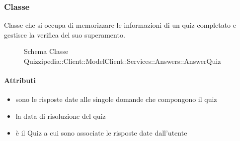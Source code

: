 \subsubsection{Classe }
Classe che si occupa di memorizzare le informazioni di un quiz completato e gestisce la verifica del suo superamento.
\begin{figure}[H]
\centering
\noindent{}
\caption[Schema Classe AnswerQuiz]{Schema Classe Quizzipedia::Client::ModelClient::Services::Answers::AnswerQuiz}
\end{figure}
\paragraph{Attributi}
\begin{itemize}
\item {}
\newline
sono le risposte date alle singole domande che compongono il quiz
\item {}
\newline
la data di risoluzione del quiz
\item {}
\newline
è il Quiz a cui sono associate le risposte date dall'utente
\end{itemize}
